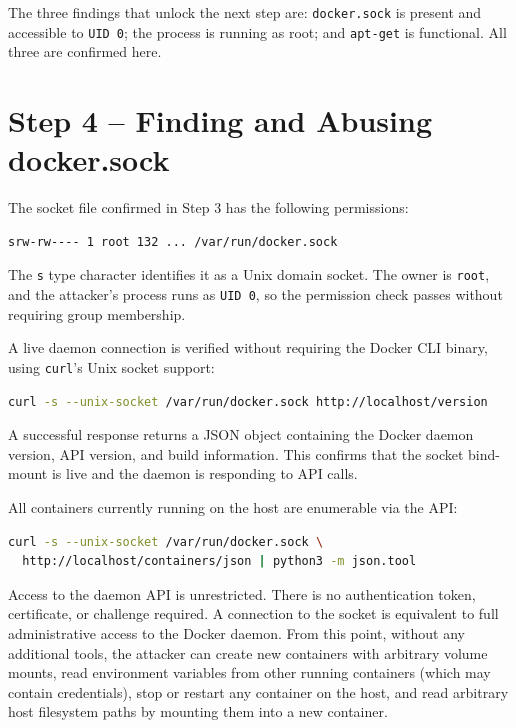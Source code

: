 The three findings that unlock the next step are: \texttt{docker.sock} is present and accessible to \texttt{UID 0}; the process is running as root; and \texttt{apt-get} is functional. All three are confirmed here.

\vspace{0.3cm}

\section{Step 4 -- Finding and Abusing docker.sock}

The socket file confirmed in Step 3 has the following permissions:

\begin{lstlisting}
srw-rw---- 1 root 132 ... /var/run/docker.sock
\end{lstlisting}

The \texttt{s} type character identifies it as a Unix domain socket. The owner is \texttt{root}, and the attacker's process runs as \texttt{UID 0}, so the permission check passes without requiring group membership.

A live daemon connection is verified without requiring the Docker CLI binary, using \texttt{curl}'s Unix socket support:

\begin{lstlisting}[language=bash]
curl -s --unix-socket /var/run/docker.sock http://localhost/version
\end{lstlisting}

A successful response returns a JSON object containing the Docker daemon version, API version, and build information. This confirms that the socket bind-mount is live and the daemon is responding to API calls.

All containers currently running on the host are enumerable via the API:

\begin{lstlisting}[language=bash]
curl -s --unix-socket /var/run/docker.sock \
  http://localhost/containers/json | python3 -m json.tool
\end{lstlisting}

Access to the daemon API is unrestricted. There is no authentication token, certificate, or challenge required. A connection to the socket is equivalent to full administrative access to the Docker daemon. From this point, without any additional tools, the attacker can create new containers with arbitrary volume mounts, read environment variables from other running containers (which may contain credentials), stop or restart any container on the host, and read arbitrary host filesystem paths by mounting them into a new container.

